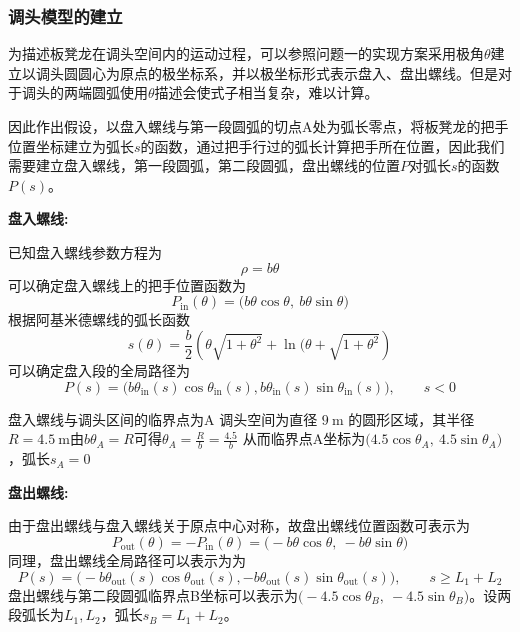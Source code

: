 \documentclass[UTF-8,a4paper,zihao=-4]{ctexart}
\begin{document}
\subsubsection{调头模型的建立}
为描述板凳龙在调头空间内的运动过程，可以参照问题一的实现方案采用极角$\theta$建立以调头圆圆心为原点的极坐标系，并以极坐标形式表示盘入、盘出螺线。但是对于调头的两端圆弧使用$\theta$描述会使式子相当复杂，难以计算。

因此作出假设，以盘入螺线与第一段圆弧的切点A处为弧长零点，将板凳龙的把手位置坐标建立为弧长$s$的函数，通过把手行过的弧长计算把手所在位置，因此我们需要建立盘入螺线，第一段圆弧，第二段圆弧，盘出螺线的位置$P$对弧长$s$的函数$P(s)$。

\noindent\textbf{盘入螺线:}

已知盘入螺线参数方程为
\begin{equation}
    \rho=b\theta
\end{equation}
可以确定盘入螺线上的把手位置函数为
\begin{equation}
P_{\mathrm{in}}(\theta)=\bigl(b\theta\cos\theta,\ b\theta\sin\theta\bigr)
\end{equation}
根据阿基米德螺线的弧长函数
\begin{equation}
s(\theta)=\frac{b}{2}\left(\theta\sqrt{1+\theta^2}+\ln(\theta+\sqrt{1+\theta^2}\right)
\end{equation}
可以确定盘入段的全局路径为
\begin{equation}
P(s)= \bigl( b\theta_{\mathrm{in}}(s)\cos\theta_{\mathrm{in}}(s),
b\theta_{\mathrm{in}}(s)\sin\theta_{\mathrm{in}}(s) \bigr), \qquad s<0
\end{equation}

盘入螺线与调头区间的临界点为A
调头空间为直径 $9\ \mathrm{m}$ 的圆形区域，其半径$R=4.5\ \mathrm{m}$由$b\theta_A=R$可得$\theta_A=\frac{R}{b}=\frac{4.5}{b}$
从而临界点A坐标为$\bigl(4.5\cos\theta_A,\ 4.5\sin\theta_A\bigr)$，弧长$s_A=0$

\noindent\textbf{盘出螺线:}

由于盘出螺线与盘入螺线关于原点中心对称，故盘出螺线位置函数可表示为
\begin{equation}
P_{\mathrm{out}}(\theta)=-P_{\mathrm{in}}(\theta) =\bigl(-b\theta\cos\theta,\ -b\theta\sin\theta\bigr)
\end{equation}
同理，盘出螺线全局路径可以表示为为
\begin{equation}
P(s)= \bigl( -b\theta_{\mathrm{out}}(s)\cos\theta_{\mathrm{out}}(s),
-b\theta_{\mathrm{out}}(s)\sin\theta_{\mathrm{out}}(s) \bigr), \qquad s\ge L_1+L_2
\end{equation}
盘出螺线与第二段圆弧临界点B坐标可以表示为$\bigl(-4.5\cos\theta_B,\ -4.5\sin\theta_B\bigr)$。设两段弧长为$L_1,L_2$，弧长$s_B=L_1+L_2$。
\end{document}
